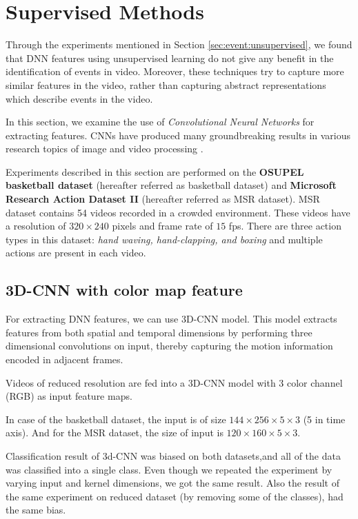 \section{Supervised Methods}
\label{sec:event:supervised}
Through the experiments mentioned in Section  \ref{sec:event:unsupervised}, we found that DNN features using unsupervised learning do not give any benefit in the identification of events in video.  Moreover, these techniques try to capture more similar features in the video, rather than capturing abstract representations which describe events in the video.

In this section, we examine the use of \textit{Convolutional Neural Networks} for extracting features.  CNNs have produced many groundbreaking results in various research topics of image and video processing \citep{KarpathyCVPR14, ji20133d, krizhevsky2012imagenet}.

Experiments described in this section are performed on the \textbf{OSUPEL basketball dataset} \cite{brendel2011probabilistic} (hereafter referred as basketball dataset) and \textbf{Microsoft Research Action Dataset \RN{2}} (hereafter referred as MSR dataset).  MSR dataset contains 54 videos recorded in a crowded environment.  These videos have a resolution of $320 \times 240$ pixels and frame rate of $15$ fps.  There are three action types in this dataset: \textit{hand waving, hand-clapping, and boxing } and multiple actions are present in each video.

\subsection{3D-CNN with color map feature}
For extracting DNN features, we can use 3D-CNN model.  This model extracts features from both spatial and temporal dimensions by performing three dimensional convolutions on input, thereby capturing the motion information encoded in adjacent frames\citep{ji20133d}.

Videos of reduced resolution are fed into a 3D-CNN model with 3 color channel (RGB) as input feature maps.

In case of the basketball dataset, the input is of size $144 \times 256 \times 5 \times 3$ (5 in time axis).  And for the MSR dataset, the size of input is $120 \times 160 \times 5 \times 3$.

Classification result of 3d-CNN was biased on both datasets,and all of the data was classified into a single class.  Even though we repeated the experiment by varying input and kernel dimensions, we got the same result.  Also the result of the same experiment on reduced dataset (by removing some of the classes), had the same bias.

